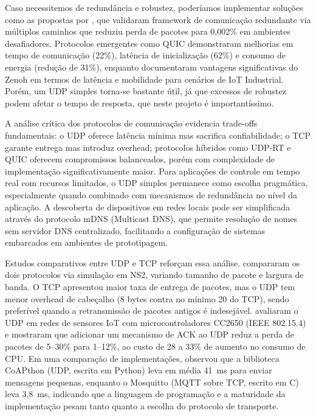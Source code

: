 Caso necessitemos de redundância e robustez, poderíamos implementar soluções como as propostas por , que validaram framework de comunicação redundante via múltiplos caminhos que reduziu perda de pacotes para 0,002\% em ambientes desafiadores. Protocolos emergentes como QUIC  demonstraram melhorias em tempo de comunicação (22\%), latência de inicialização (62\%) e consumo de energia (redução de 31\%), enquanto  documentaram vantagens significativas do Zenoh em termos de latência e mobilidade para cenários de IoT Industrial. Porém, um UDP simples torna-se bastante útil, já que excessos de robustez podem afetar o tempo de resposta, que neste projeto é importantíssimo.

A análise crítica dos protocolos de comunicação evidencia trade-offs fundamentais: o UDP oferece latência mínima mas sacrifica confiabilidade; o TCP garante entrega mas introduz overhead; protocolos híbridos como UDP-RT e QUIC oferecem compromissos balanceados, porém com complexidade de implementação significativamente maior. Para aplicações de controle em tempo real com recursos limitados, o UDP simples permanece como escolha pragmática, especialmente quando combinado com mecanismos de redundância no nível da aplicação. A descoberta de dispositivos em redes locais pode ser simplificada através do protocolo mDNS (Multicast DNS), que permite resolução de nomes sem servidor DNS centralizado, facilitando a configuração de sistemas embarcados em ambientes de prototipagem.

Estudos comparativos entre UDP e TCP reforçam essa análise.  compararam os dois protocolos via simulação em NS2, variando tamanho de pacote e largura de banda. O TCP apresentou maior taxa de entrega de pacotes, mas o UDP tem menor overhead de cabeçalho (8 bytes contra no mínimo 20 do TCP), sendo preferível quando a retransmissão de pacotes antigos é indesejável.  avaliaram o UDP em redes de sensores IoT com microcontroladores CC2650 (IEEE 802.15.4) e mostraram que adicionar um mecanismo de ACK ao UDP reduz a perda de pacotes de 5--30\% para 1--12\%, ao custo de 28 a 33\% de aumento no consumo de CPU. Em uma comparação de implementações,  observou que a biblioteca CoAPthon (UDP, escrita em Python) leva em média 41~ms para enviar mensagens pequenas, enquanto o Mosquitto (MQTT sobre TCP, escrito em C) leva 3,8~ms, indicando que a linguagem de programação e a maturidade da implementação pesam tanto quanto a escolha do protocolo de transporte.


